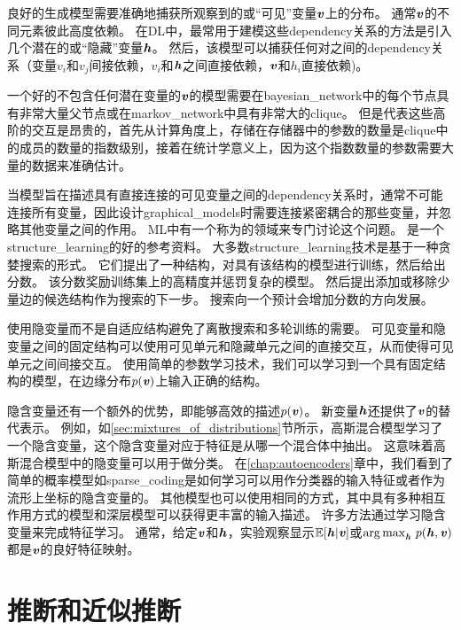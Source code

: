 良好的生成模型需要准确地捕获所观察到的或“可见”变量$\boldsymbol{\mathit{v}}$上的分布。
通常$\boldsymbol{\mathit{v}}$的不同元素彼此高度依赖。
在\gls{DL}中，最常用于建模这些\gls{dependency}关系的方法是引入几个潜在的或“隐藏”变量$\boldsymbol{\mathit{h}}$。
然后，该模型可以捕获任何对之间的\gls{dependency}关系（变量$v_i$和$v_j$间接依赖，$v_i$和$\boldsymbol{\mathit{h}}$之间直接依赖，$\boldsymbol{\mathit{v}}$和$h_i$直接依赖)。

一个好的不包含任何潜在变量的$\boldsymbol{\mathit{v}}$的模型需要在\gls{bayesian_network}中的每个节点具有非常大量父节点或在\gls{markov_network}中具有非常大的\gls{clique}。
但是代表这些高阶的交互是昂贵的，首先从计算角度上，存储在存储器中的参数的数量是\gls{clique}中的成员的数量的指数级别，接着在统计学意义上，因为这个指数数量的参数需要大量的数据来准确估计。


当模型旨在描述具有直接连接的可见变量之间的\gls{dependency}关系时，通常不可能连接所有变量，因此设计\gls{graphical_models}时需要连接紧密耦合的那些变量，并忽略其他变量之间的作用。
\gls{ML}中有一个称为的领域来专门讨论这个问题。
\citet{koller-book2009}是一个\gls{structure_learning}的好的参考资料。
大多数\gls{structure_learning}技术是基于一种贪婪搜索的形式。
它们提出了一种结构，对具有该结构的模型进行训练，然后给出分数。 
该分数奖励训练集上的高精度并惩罚复杂的模型。
然后提出添加或移除少量边的候选结构作为搜索的下一步。
搜索向一个预计会增加分数的方向发展。 


使用隐变量而不是自适应结构避免了离散搜索和多轮训练的需要。 
可见变量和隐变量之间的固定结构可以使用可见单元和隐藏单元之间的直接交互，从而使得可见单元之间间接交互。
使用简单的参数学习技术，我们可以学习到一个具有固定结构的模型，在边缘分布$p(\boldsymbol{\mathit{v}})$上输入正确的结构。


隐含变量还有一个额外的优势，即能够高效的描述$p(\boldsymbol{\mathit{v}})$。
新变量$\boldsymbol{\mathit{h}}$还提供了$\boldsymbol{\mathit{v}}$的替代表示。
例如，如\ref{sec:mixtures_of_distributions}节所示，高斯混合模型学习了一个隐含变量，这个隐含变量对应于特征是从哪一个混合体中抽出。
这意味着高斯混合模型中的隐变量可以用于做分类。
在\ref{chap:autoencoders}章中，我们看到了简单的概率模型如\gls{sparse_coding}是如何学习可以用作分类器的输入特征或者作为流形上坐标的隐含变量的。
其他模型也可以使用相同的方式，其中具有多种相互作用方式的模型和深层模型可以获得更丰富的输入描述。
许多方法通过学习隐含变量来完成特征学习。
通常，给定$\boldsymbol{\mathit{v}}$和$\boldsymbol{\mathit{h}}$，实验观察显示$\mathbb{E}[\boldsymbol{\mathit{h}}\vert\boldsymbol{\mathit{v}}]$或${\arg\max}_{\boldsymbol{\mathit{h}}}\ p(\boldsymbol{\mathit{h}},\boldsymbol{\mathit{v}})$都是$\boldsymbol{\mathit{v}}$的良好特征映射。

\section{推断和近似推断}
\label{sec:inference_and_approximate_inference}


